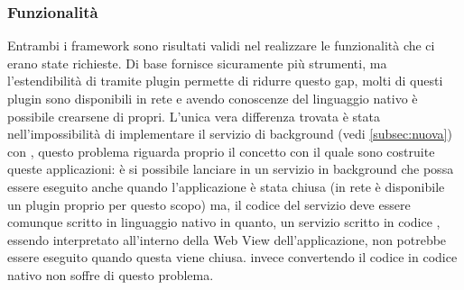         \subsubsection{Funzionalità}
        Entrambi i framework sono risultati validi nel realizzare le
        funzionalità che ci erano state richieste. Di base \tisdk{} fornisce
        sicuramente più strumenti, ma l'estendibilità di \pg{} tramite plugin
        permette di ridurre questo gap, molti di questi plugin sono
        disponibili in rete e avendo conoscenze del linguaggio nativo è
        possibile crearsene di propri. L'unica vera differenza
        trovata è stata nell'impossibilità di implementare il servizio di
        background (vedi \ref{subsec:nuova}) con \pg{}, questo problema
        riguarda proprio il concetto con
        il quale sono costruite queste applicazioni: è si possibile lanciare
        in \js{}
        un servizio in background che possa essere eseguito anche quando
        l'applicazione è stata chiusa (in rete è disponibile un plugin proprio
        per questo scopo) ma, il codice del servizio deve essere comunque
        scritto in linguaggio nativo in quanto, un servizio scritto in codice
        \js{}, essendo interpretato all'interno della Web View
        dell'applicazione, non potrebbe essere eseguito quando questa viene
        chiusa.
        \tisdk{} invece convertendo il codice \js{} in codice nativo non
        soffre di questo problema.
